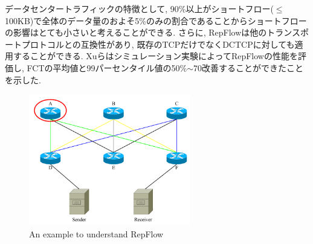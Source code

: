 データセンタートラフィックの特徴として,
90\%以上がショートフロー($\leq$100KB)で全体のデータ量のおよそ5\%のみの割合である\cite{dctcp,
p_fab}ことからショートフローの影響はとても小さいと考えることができる. 
さらに, RepFlowは他のトランスポートプロトコルとの互換性があり,
既存のTCPだけでなくDCTCP\cite{dctcp}に対しても適用することができる. 
Xuらはシミュレーション実験によってRepFlowの性能を評価し,
FCTの平均値と99パーセンタイル値の50\%$\sim$70改善することができたことを示した. 
\begin{figure}[t]
    \begin{center}
    \includegraphics[autoebb, width=200pt]{./img/repflow_ie.pdf}
    \caption{An example to understand RepFlow}
    \label{fig:repflow_scheario}
    \end{center}
\end{figure}
% 
